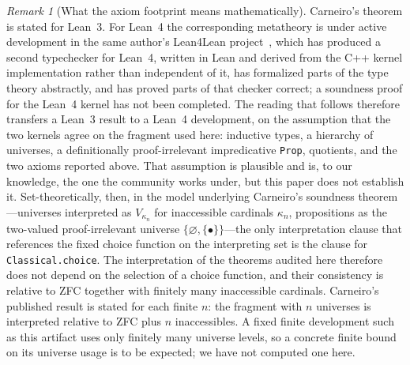 \documentclass[11pt]{article}
\theoremstyle{definition}
\theoremstyle{remark}
\newtheorem{remark}[theorem]{Remark}
\begin{document}
\begin{remark}[What the axiom footprint means mathematically]
Carneiro's theorem is stated for Lean~3.  For Lean~4 the corresponding metatheory is under active development in the same author's Lean4Lean project~\cite{carneiro-2024}, which has produced a second typechecker for Lean~4, written in Lean and derived from the C++ kernel implementation rather than independent of it, has formalized parts of the type theory abstractly, and has proved parts of that checker correct; a soundness proof for the Lean~4 kernel has not been completed.  The reading that follows therefore transfers a Lean~3 result to a Lean~4 development, on the assumption that the two kernels agree on the fragment used here: inductive types, a hierarchy of universes, a definitionally proof-irrelevant impredicative \texttt{Prop}, quotients, and the two axioms reported above.  That assumption is plausible and is, to our knowledge, the one the community works under, but this paper does not establish it.  Set-theoretically, then, in the model underlying Carneiro's soundness theorem---universes interpreted as $V_{\kappa_n}$ for inaccessible cardinals $\kappa_n$, propositions as the two-valued proof-irrelevant universe $\{\varnothing,\{\bullet\}\}$---the only interpretation clause that references the fixed choice function on the interpreting set is the clause for \texttt{Classical.choice}.  The interpretation of the theorems audited here therefore does not depend on the selection of a choice function, and their consistency is relative to ZFC together with finitely many inaccessible cardinals.  Carneiro's published result is stated for each finite $n$: the fragment with $n$ universes is interpreted relative to ZFC plus $n$ inaccessibles.  A fixed finite development such as this artifact uses only finitely many universe levels, so a concrete finite bound on its universe usage is to be expected; we have not computed one here.


\end{remark}
\end{document}
